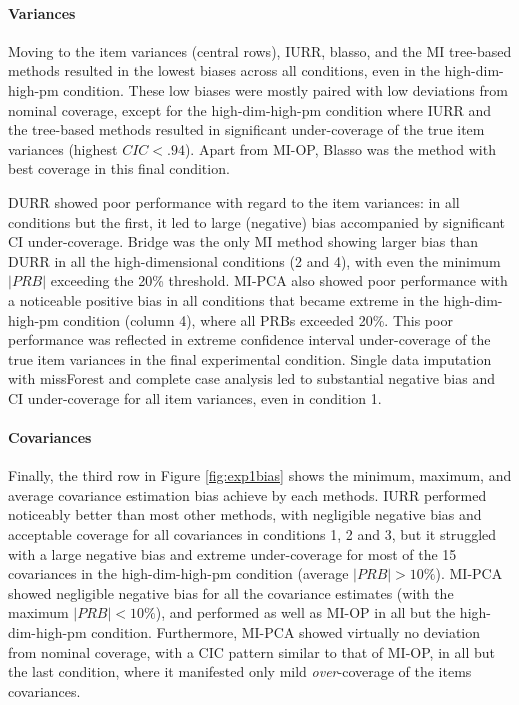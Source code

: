 	\paragraph{Variances} 
	Moving to the item variances (central rows), IURR, blasso, and the MI tree-based methods resulted in the lowest
	biases across all conditions, even in the high-dim-high-pm condition.
	These low biases were mostly paired with low deviations from nominal coverage, except for the high-dim-high-pm
	condition where IURR and the tree-based methods resulted in significant under-coverage of the true item 
	variances (highest $CIC < .94$).
	Apart from MI-OP, Blasso was the method with best coverage in this final condition.
	
	DURR showed poor performance with regard to the item variances: in all conditions but the first, it led to 
	large (negative) bias accompanied by significant CI under-coverage.
	Bridge was the only MI method showing larger bias than DURR in all the high-dimensional conditions (2 and 4),
	with even the minimum $|PRB|$ exceeding the 20\% threshold.
	MI-PCA also showed poor performance with a noticeable positive bias in all conditions that became extreme in the
	high-dim-high-pm condition (column 4), where all PRBs exceeded 20\%.
	This poor performance was reflected in extreme confidence interval under-coverage of the true item variances in
	the final experimental condition.
	Single data imputation with missForest and complete case analysis led to substantial negative bias and 
	CI under-coverage for all item variances, even in condition 1.

	\paragraph{Covariances}
	Finally, the third row in Figure \ref{fig:exp1bias} shows the minimum, maximum, and average covariance 
	estimation bias achieve by each methods.
	IURR performed noticeably better than most other methods, with negligible negative bias and acceptable 
	coverage for all covariances in conditions 1, 2 and 3, but it struggled with a large negative bias and 
	extreme under-coverage for most of the 15 covariances in the high-dim-high-pm condition (average $|PRB| > 10\%$).
	MI-PCA showed negligible negative bias for all the covariance estimates (with the maximum $|PRB| < 10\%$), 
	and performed as well as MI-OP in all but the high-dim-high-pm condition.
	Furthermore, MI-PCA showed virtually no deviation from nominal coverage, with a CIC pattern similar to 
	that of MI-OP, in all but the last condition, where it manifested only mild \emph{over}-coverage of the 
	items covariances.

